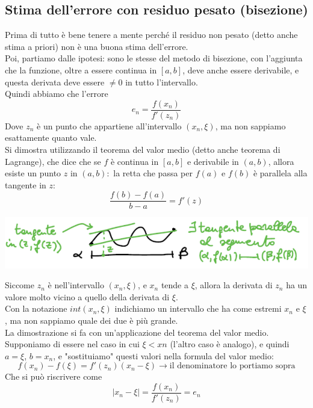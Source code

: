 \subsection{Stima dell'errore con residuo pesato (bisezione)}
Prima di tutto è bene tenere a mente perché il residuo non pesato (detto anche stima a priori) non è una buona stima dell'errore.\\
Poi, partiamo dalle ipotesi: sono le stesse del metodo di bisezione, con l'aggiunta che la funzione, oltre a essere continua in $[a,b]$, deve anche essere derivabile, e questa derivata deve essere $\neq 0$ in tutto l'intervallo.\\
Quindi abbiamo che l'errore 
\begin{displaymath}
    e_n=\frac{f(x_n)}{f'(z_n)}
\end{displaymath}
Dove $z_n$ è un punto che appartiene all'intervallo $(x_n, \xi)$, ma non sappiamo esattamente quanto vale.\\
Si dimostra utilizzando il teorema del valor medio (detto anche teorema di Lagrange), che dice che se $f$ è continua in $[a,b]$ e derivabile in $(a,b)$, allora esiste un punto $z$ in $(a,b):$ la retta che passa per $f(a)$ e $f(b)$ è parallela alla tangente in $z$:
\begin{displaymath}
    \frac{f(b)-f(a)}{b-a}=f'(z)
\end{displaymath}

\begin{center}
    \includegraphics[scale=0.7]{./res/img/lagrange1.png}
\end{center}
Siccome $z_n$ è nell'intervallo $(x_n,\xi)$, e $x_n$ tende a $\xi$, allora la derivata di $z_n$ ha un valore molto vicino a quello della derivata di $\xi$.\\
Con la notazione $int(x_n,\xi)$ indichiamo un intervallo che ha come estremi $x_n$ e $\xi$, ma non sappiamo quale dei due è più grande.\\
La dimostrazione si fa con un'applicazione del teorema del valor medio. Supponiamo di essere nel caso in cui $\xi < xn$ (l'altro caso è analogo), e quindi $a=\xi$, $b=x_n$, e "sostituiamo" questi valori nella formula del valor medio:\\
\begin{displaymath}
    f(x_n)-f(\xi)=f'(z_n)(x_n-\xi) \xrightarrow{}\text{il denominatore lo portiamo sopra}
\end{displaymath}
Che si può riscrivere come
\begin{displaymath}
    |x_n-\xi|=\frac{f(x_n)}{f'(z_n)}=e_n
\end{displaymath}

